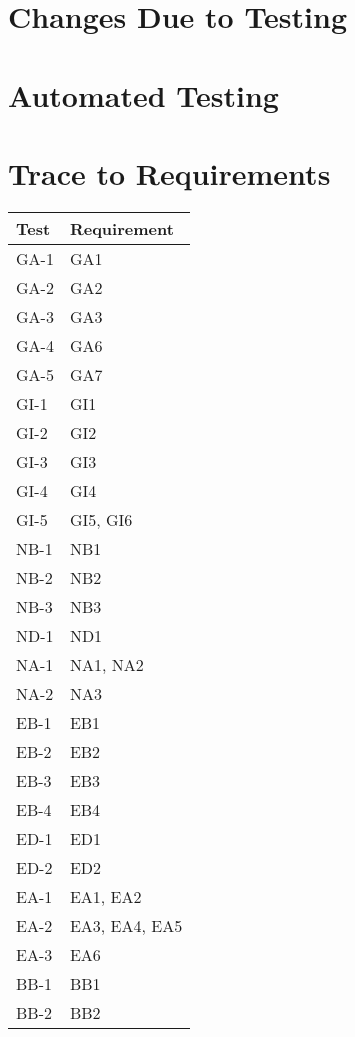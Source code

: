 \documentclass[12pt, titlepage]{article}
\begin{document}
\section{Changes Due to Testing}

\section{Automated Testing}
		
\section{Trace to Requirements}

\begin{longtable}{| p{} | p{} |}
  \hline
  Test & Requirement\\
  \hline
  GA-1 & GA1\\
  \hline
  GA-2 & GA2\\
  \hline
  GA-3 & GA3\\
  \hline
  GA-4 & GA6\\
  \hline
  GA-5 & GA7\\
  \hline
  GI-1 & GI1\\
  \hline
  GI-2 & GI2\\
  \hline
  GI-3 & GI3\\
  \hline
  GI-4 & GI4\\
  \hline
  GI-5 & GI5, GI6\\
  \hline
  NB-1 & NB1\\
  \hline
  NB-2 & NB2\\
  \hline
  NB-3 & NB3\\
  \hline
  ND-1 & ND1\\
  \hline
  NA-1 & NA1, NA2\\
  \hline
  NA-2 & NA3\\
  \hline
  EB-1 & EB1\\
  \hline
  EB-2 & EB2\\
  \hline
  EB-3 & EB3\\
  \hline
  EB-4 & EB4\\
  \hline
  ED-1 & ED1\\
  \hline
  ED-2 & ED2\\
  \hline
  EA-1 & EA1, EA2\\
  \hline
  EA-2 & EA3, EA4, EA5\\
  \hline
  EA-3 & EA6\\
  \hline
  BB-1 & BB1\\
  \hline
  BB-2 & BB2\\

\end{longtable}
\end{document}
